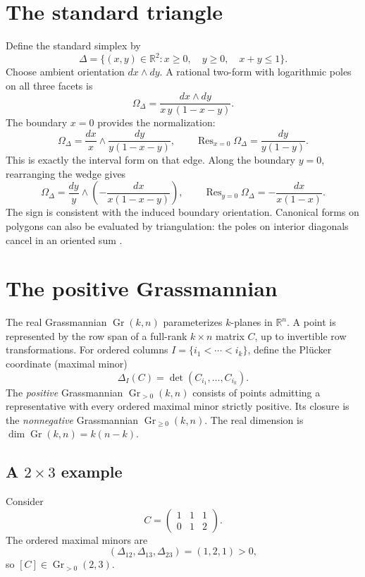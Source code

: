 \documentclass[11pt,a4paper]{article}
\newcommand{\Gr}{\operatorname{Gr}}
\newcommand{\Res}{\operatorname{Res}}
\begin{document}
\section{The standard triangle}
Define the standard simplex by
\[
\Delta=\{(x,y)\in\mathbb R^2:x\geq0,\quad
y\geq0,\quad x+y\leq1\}.
\]
Choose ambient orientation $dx\wedge dy$.
A rational two-form with logarithmic poles on all three facets
is
\begin{equation}
\boxed{\Omega_\Delta=
\frac{dx\wedge dy}{x\,y\,(1-x-y)}.}
\label{eq:triangle}
\end{equation}
The boundary $x=0$ provides the normalization:
\[
\Omega_\Delta=\frac{dx}{x}\wedge
\frac{dy}{y(1-x-y)},\qquad
\Res_{x=0}\Omega_\Delta=\frac{dy}{y(1-y)}.
\]
This is exactly the interval form on that edge.
Along the boundary $y=0$, rearranging the wedge gives
\[
\Omega_\Delta=\frac{dy}{y}\wedge
\left(-\frac{dx}{x(1-x-y)}\right),\qquad
\Res_{y=0}\Omega_\Delta=-\frac{dx}{x(1-x)}.
\]
The sign is consistent with the induced boundary orientation.
Canonical forms on polygons can also be evaluated by
triangulation: the poles on interior diagonals cancel in
an oriented sum \cite{ABL}.

\section{The positive Grassmannian}
The real Grassmannian $\Gr(k,n)$ parameterizes $k$-planes
in $\mathbb R^n$.
A point is represented by the row span of a full-rank
$k\times n$ matrix $C$, up to invertible row transformations.
For ordered columns $I=\{i_1<\cdots<i_k\}$, define the Pl\"ucker
coordinate (maximal minor)
\begin{equation}
\Delta_I(C)=\det(C_{i_1},\ldots,C_{i_k}).
\end{equation}
The \emph{positive} Grassmannian $\Gr_{>0}(k,n)$ consists of
points admitting a representative with every ordered maximal
minor strictly positive. Its closure is the \emph{nonnegative}
Grassmannian $\Gr_{\geq0}(k,n)$. The real dimension is
$\dim\Gr(k,n)=k(n-k)$.

\subsection{A $2\times3$ example}
Consider
\[
C=\begin{pmatrix}1&1&1\\0&1&2\end{pmatrix}.
\]
The ordered maximal minors are
\[
(\Delta_{12},\Delta_{13},\Delta_{23})=(1,2,1)>0,
\]
so $[C]\in\Gr_{>0}(2,3)$.
\end{document}
